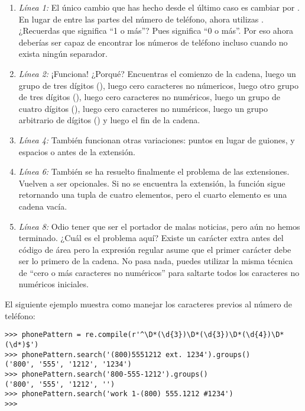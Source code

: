 \begin{enumerate}

\item \emph{Línea 1:} El único cambio que has hecho desde el último caso es cambiar \codigo{+} por \codigo{*}. En lugar de  entre las partes del número de teléfono, ahora utilizas . ¿Recuerdas que \codigo{+} significa ``1 o más''? Pues \codigo{*} significa ``0 o más''. Por eso ahora deberías ser capaz de encontrar los números de teléfono incluso cuando no exista ningún separador.

\item \emph{Línea 2:} ¡Funciona! ¿Porqué? Encuentras el comienzo de la cadena, luego un grupo de tres dígitos (), luego cero caracteres no númericos, luego otro grupo de tres dígitos (), luego cero caracteres no numéricos, luego un grupo de cuatro dígitos (), luego cero caracteres no numéricos, luego un grupo arbitrario de dígitos () y luego el fin de la cadena.

\item \emph{Línea 4:} También funcionan otras variaciones: puntos en lugar de guiones, y espacios o  antes de la extensión.

\item \emph{Línea 6:} También se ha resuelto finalmente el problema de las extensiones. Vuelven a ser opcionales. Si no se encuentra la extensión, la función  sigue retornando una tupla de cuatro elementos, pero el cuarto elemento es una cadena vacía.

\item \emph{Línea 8:} Odio tener que ser el portador de malas noticias, pero aún no hemos terminado. ¿Cuál es el problema aquí? Existe un carácter extra antes del código de área pero la expresión regular asume que el primer carácter debe ser lo primero de la cadena. No pasa nada, puedes utilizar la misma técnica de ``cero o más caracteres no numéricos'' para saltarte todos los caracteres no numéricos iniciales. 

\end{enumerate}
 
El siguiente ejemplo muestra como manejar los caracteres previos al número de teléfono:

\noindent\begin{minipage}{\textwidth}
\begin{lstlisting}[mathescape=False]
>>> phonePattern = re.compile(r'^\D*(\d{3})\D*(\d{3})\D*(\d{4})\D*(\d*)$')
>>> phonePattern.search('(800)5551212 ext. 1234').groups()
('800', '555', '1212', '1234')
>>> phonePattern.search('800-555-1212').groups()
('800', '555', '1212', '')
>>> phonePattern.search('work 1-(800) 555.1212 #1234')
>>> 
\end{lstlisting}
\end{minipage}

